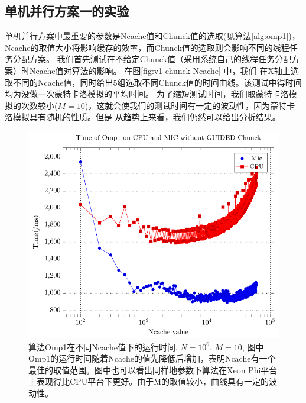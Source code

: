 \subsection{单机并行方案一的实验} %
\label{sub:bsV1}
单机并行方案中最重要的参数是Ncache值和Chunck值的选取(见算法\ref{alg:omp1})，
Ncache的取值大小将影响缓存的效率，而Chunck值的选取则会影响不同的线程任务分配方案。
我们首先测试在不给定Chunck值（采用系统自己的线程任务分配方案）时Ncache值对算法的影响。
在图\ref{fig:v1-chunck-Ncache} 中，我们
在X轴上选取不同的Ncache值，同时给出5组选取不同Chunck值的时间曲线。该测试中得时间均为没做一次蒙特卡洛模拟的平均时间。
为了缩短测试时间，我们取蒙特卡洛模拟的次数较小($M=10$)，这就会使我们的测试时间有一定的波动性，因为蒙特卡洛模拟具有随机的性质。但是
从趋势上来看，我们仍然可以给出分析结果。
\begin{figure}[!t]
   \centering
   \includegraphics[width=\textwidth]{chap5/Figures/bsV1-6-mic-cpu-Time-Chunck-0.pdf}
   \caption{算法Omp1在不同Ncache值下的运行时间, $N=10^6$, $M=10$, 图中Omp1的运行时间随着Ncache的值先降低后增加，表明Ncache有一个
   最佳的取值范围。图中也可以看出同样地参数下算法在Xeon Phi平台上表现得比CPU平台下更好。由于M的取值较小，曲线具有一定的波动性。}
   \label{fig:v1-Ncache}
\end{figure}

